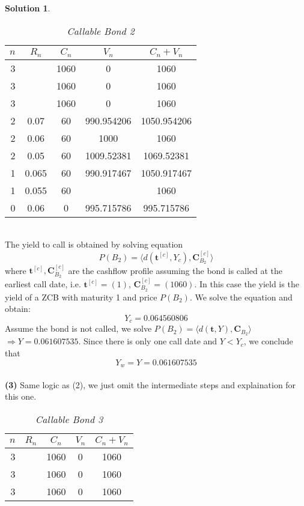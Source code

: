 \documentclass[a4paper, 10pt]{article}
\renewcommand{\arraystretch}{1.4}
\theoremstyle{definition}
\theoremstyle{hSol}
\newtheorem*{solution}{Solution}
\begin{document}
\begin{solution}
\begin{table}[H]
\vspace{-1pt}
\caption{\textit{Callable Bond 2}}
\vspace{-7pt}
\centering
\def\arraystretch{1.15}
\begin{tabular}{|r|cccc|}
\hline
$n$ & $R_n$ & $C_n$ & $V_n$ & $C_n+V_n$\\ 
\hline
3 &  & 1060 & 0& 1060\\
3 &  & 1060 & 0& 1060\\
3 &  & 1060 & 0& 1060\\
\hline
2 & 0.07 & 60 & 990.954206 & 1050.954206\\
2 & 0.06 & 60 & 1000 & 1060\\
2 & 0.05 & 60 & 1009.52381 & 1069.52381 \\
\hline
1 & 0.065 & 60 & 990.917467 & 1050.917467\\
1 & 0.055 & 60 & \color{red}{1000} & 1060\\
\hline
0 & 0.06 & 0 & 995.715786 & 995.715786\\
\hline
\end{tabular}
\label{tab:cbc2}
\end{table}
~\\
The yield to call is obtained by solving equation
$$
P(B_2) = \langle d(\bm{t}^{[c]}, Y_c), \bm{C}_{B_2}^{[c]} \rangle
$$
where $\bm{t}^{[c]}, \bm{C}_{B_2}^{[c]}$ are the cashflow profile assuming the bond is called at the earliest call date, i.e. $\bm{t}^{[c]}=(1)$, $\bm{C}_{B_2}^{[c]}=(1060)$. In this case the yield is the yield of a ZCB with maturity 1 and price $P(B_2)$. We solve the equation and obtain:
$$
Y_c = 0.064560806
$$
Assume the bond is not called, we solve $P(B_2) = \langle d(\bm{t}, Y), \bm{C}_{B_2} \rangle$ $\Rightarrow Y = 0.061607535$. Since there is only one call date and $Y<Y_c$, we conclude that
$$
Y_w = Y = 0.061607535
$$
~\\
\textbf{(3)} Same logic as (2), we just omit the intermediate steps and explaination for this one.
\begin{table}[H]
\vspace{-1pt}
\caption{\textit{Callable Bond 3}}
\vspace{-7pt}
\centering
\def\arraystretch{1.15}
\begin{tabular}{|r|cccc|}
\hline
$n$ & $R_n$ & $C_n$ & $V_n$ & $C_n+V_n$\\ 
\hline
3 &  & 1060 & 0& 1060\\
3 &  & 1060 & 0& 1060\\
3 &  & 1060 & 0& 1060\\

\end{tabular}
\end{table}
\end{solution}
\end{document}
